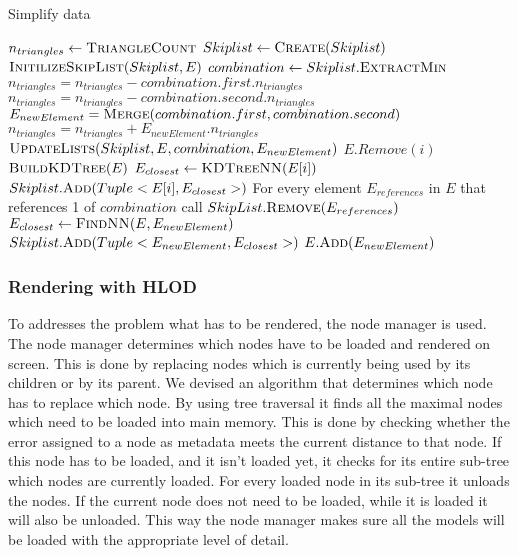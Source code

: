 \begin{algorithm}
\caption{Simplify data}\label{alg:SimplifyData}
\begin{algorithmic}[1]
 
\State {}
\State $n_{triangles} \gets \Call{TriangleCount}{}$
\State $Skiplist \gets \Call{Create}{Skiplist}$ 
\State $\Call{InitilizeSkipList}{Skiplist, E}$
    \State $combination \gets Skiplist.\Call{ExtractMin}{}$
    \State $n_{triangles} = n_{triangles} - combination.first.n_{triangles}$
    \State $n_{triangles} = n_{triangles} - combination.second.n_{triangles}$
    \State $E_{newElement} = \Call{Merge}{combination.first, combination.second}$
    \State $n_{triangles} = n_{triangles} + E_{newElement}.n_{triangles}$
    \State $\Call{UpdateLists}{Skiplist, E, combination, E_{newElement}}$
\EndWhile
\EndProcedure
{}
        \State $E.Remove(i)$
    \EndIf
\EndFor
\EndFunction
{}
\State $\Call{BuildKDTree}{E}$
    \State $E_{closest} \gets \Call{KDTreeNN}{E[i]}$ 
    \State $Skiplist.\Call{Add}{Tuple<E[i], E_{closest}>}$
\EndFor
\EndFunction
{}
\State For every element $E_{references}$ in $E$ that references 1 of $combination$ call $SkipList.\Call{Remove}{E_{references}}$
\State $E_{closest} \gets \Call{FindNN}{E, E_{newElement}}$ 
\State $Skiplist.\Call{Add}{Tuple<E_{newElement}, E_{closest}>}$
\State $E.\Call{Add}{E_{newElement}}$
\EndFunction
\end{algorithmic}
\end{algorithm}

\subsubsection{Rendering with HLOD}
To addresses the problem what has to be rendered, the node manager is used. The node manager determines which nodes have to be loaded and rendered on screen. This is done by replacing nodes which is currently being used by its children or by its parent. We devised an algorithm that determines which node has to replace which node. By using tree traversal it finds all the maximal nodes which need to be loaded into main memory. This is done by checking whether the error assigned to a node as metadata meets the current distance to that node. If this node has to be loaded, and it isn’t loaded yet, it checks for its entire sub-tree which nodes are currently loaded. For every loaded node in its sub-tree it unloads the nodes. If the current node does not need to be loaded, while it is loaded it will also be unloaded. This way the node manager makes sure all the models will be loaded with the appropriate level of detail. 
